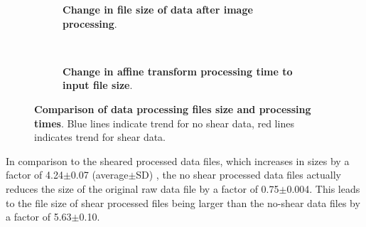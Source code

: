 \begin{figure}[H]
    \centering
        \begin{subfigure}[t]{0.4\textwidth}
        \centering
        \caption{\textbf{Change in file size of data after image processing}.}
        \label{fig:enter-label}
        \end{subfigure}
        \hspace{2em}
        ~
        \begin{subfigure}[t]{0.4\textwidth}
        \centering
        \caption{\textbf{Change in affine transform processing time to input file size}.}
        \label{fig:enter-label}
        \end{subfigure}
    \caption{\textbf{Comparison of data processing files size and processing times}. Blue lines indicate trend for no shear data, red lines indicates trend for shear data.}
    \label{fig:enter-label}
\end{figure}

In comparison to the sheared processed data files, which increases in sizes by a factor of 4.24$\pm$0.07 (average$\pm$SD) , the no shear processed data files actually reduces the size of the original raw data file by a factor of 0.75$\pm$0.004. This leads to the file size of shear processed files being larger than the no-shear data files by a factor of 5.63$\pm$0.10. 

